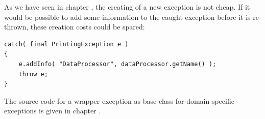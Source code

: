 As we have seen in chapter , the creating of a new exception is not cheap. If it would be possible to add some information to the caught exception before it is re-thrown, these creation costs could be spared:
\begin{lstlisting}[firstnumber=5]
catch( final PrintingException e )
{
    e.addInfo( "DataProcessor", dataProcessor.getName() );
    throw e;
}
\end{lstlisting}

The source code for a wrapper exception as base class for domain specific exceptions is given in chapter .

